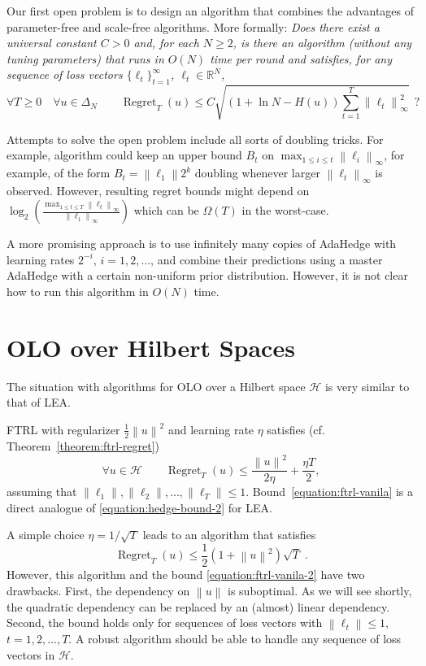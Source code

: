 \documentclass{colt2016} %
\DeclareMathOperator{\Regret}{Regret}
\newcommand{\R}{\mathbb{R}}     %
\renewcommand{\H}{\mathcal{H}}  %
\newcommand{\norm}[1]{\left\|{#1}\right\|}
\begin{document}
Our first open problem is to design an algorithm that combines the advantages
of parameter-free and scale-free algorithms. More formally: \emph{Does there
exist a universal constant $C > 0$ and, for each $N \ge 2$, is there an
algorithm (without any tuning parameters) that runs in $O(N)$ time per round
and satisfies, for any sequence of loss
vectors $\{\ell_t\}_{t=1}^\infty$, $\ell_t \in \R^N$,}
\begin{equation}
\forall T \ge 0 \quad \forall u \in \Delta_N \qquad \Regret_T(u) \le C \sqrt{(1 + \ln N - H(u)) \sum_{t=1}^T \norm{\ell_t}_\infty^2} \ \ ?
\end{equation}

Attempts to solve the open problem include all sorts of doubling tricks.
For example, algorithm could keep an upper bound $B_t$ on $\max_{1 \le i \le t}
\norm{\ell_i}_\infty$, for example, of the form $B_t = \norm{\ell_1} 2^k$
doubling whenever larger $\norm{\ell_t}_\infty$ is observed. However, resulting
regret bounds might depend on $\log_2 \left( \frac{\max_{1 \le t \le T}
\norm{\ell_t}_\infty}{\norm{\ell_1}_\infty} \right)$ which can be $\Omega(T)$
in the worst-case.

A more promising approach is to use infinitely many copies of AdaHedge with
learning rates $2^{-i}$, $i=1,2,\dots$, and combine their predictions using
a master AdaHedge with a certain non-uniform prior distribution. However, it is not clear how to run this
algorithm in $O(N)$ time.

\section{OLO over Hilbert Spaces}

The situation with algorithms for OLO over a Hilbert space $\H$ is very similar
to that of LEA.

FTRL with regularizer
$\frac{1}{2}\norm{u}^2$ and learning rate $\eta$ satisfies (cf. Theorem~\ref{theorem:ftrl-regret})
\begin{equation}
\label{equation:ftrl-vanila}
\forall u \in \H \qquad \Regret_T(u) \le \frac{\norm{u}^2}{2\eta} + \frac{\eta T}{2},
\end{equation}
assuming that $\norm{\ell_1}, \norm{\ell_2}, \dots, \norm{\ell_T} \le 1$.
Bound~\eqref{equation:ftrl-vanila} is a direct analogue of
\eqref{equation:hedge-bound-2} for LEA.

A simple choice $\eta = 1/\sqrt{T}$ leads to an algorithm that satisfies
\begin{equation}
\label{equation:ftrl-vanila-2}
\Regret_T(u) \le \frac{1}{2}\left(1+\norm{u}^2\right)\sqrt{T} \; .
\end{equation}
However, this algorithm and the bound \eqref{equation:ftrl-vanila-2} have two
drawbacks.  First, the dependency on $\norm{u}$ is suboptimal. As we will see
shortly, the quadratic dependency can be replaced by an (almost) linear
dependency.  Second, the bound holds only for sequences of loss vectors with
$\norm{\ell_t} \le 1$, $t=1,2,\dots,T$. A robust algorithm should be able to
handle any sequence of loss vectors in $\H$.
\end{document}
